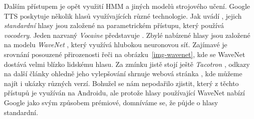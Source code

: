 Dalším přístupem je opět využití HMM a jiných modelů strojového učení.
Google TTS poskytuje několik hlasů využívajících různé technologie. Jak uvádí \citep{google_tts},
jejich \textit{standardní} hlasy jsou založené na parametrickém přístupu,
který používá \textit{vocodery}. Jeden
nazvaný \textit{Vocaine} představuje \citet{vocaine_2015}. Zbylé nabízené
hlasy jsou založené na modelu \textit{WaveNet} \citep{oord_wavenet_2016},
který využívá hlubokou neuronovou síť. Zajímavé je srovnání posouzené
přirozenosti řeči na obrázku~\ref{img-wavenet}, kde se WaveNet dostává velmi blízko
lidskému hlasu. Za zmínku jistě stojí ještě \textit{Tacotron} \citep{wang2017tacotron},
odkazy na další články ohledně jeho vylepšování shrnuje webová
stránka \citep{google_github_tacotron}, kde můžeme najít i ukázky různých verzí.
Bohužel se nám nepodařilo zjistit, který z těchto přístupů je využíván
na Androidu, ale protože hlasy používající WaveNet nabízí Google jako svým
způsobem prémiové, domníváme se, že půjde o hlasy standardní.

